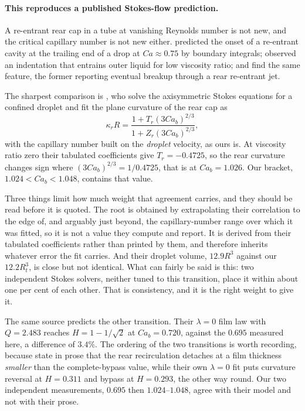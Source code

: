 \documentclass[11pt,a4paper]{article}
\begin{document}
\paragraph{This reproduces a published Stokes-flow prediction.} A re-entrant
rear cap in a tube at vanishing Reynolds number is not new, and the critical
capillary number is not new either. \citet{martinez1990axisymmetric} predicted
the onset of a re-entrant cavity at the trailing end of a drop at $Ca\approx
0.75$ by boundary integrals; \citet{olbricht1992deformation} observed an
indentation that entrains outer liquid for low viscosity ratio;
\citet{lac2009motion} and \citet{nath2017migration} find the same feature, the
former reporting eventual breakup through a rear re-entrant jet.

The sharpest comparison is \citet{balestra2018viscous}, who solve the
axisymmetric Stokes equations for a confined droplet and fit the plane
curvature of the rear cap as
\begin{equation}
  \kappa_r R=\frac{1+T_r(3Ca_b)^{2/3}}{1+Z_r(3Ca_b)^{2/3}},
  \label{eq:rearcurv}
\end{equation}
with the capillary number built on the \emph{droplet} velocity, as ours is. At viscosity ratio
zero their tabulated coefficients give $T_r=-0.4725$, so the rear curvature
changes sign where $(3Ca_b)^{2/3}=1/0.4725$, that is at $Ca_b=1.026$. Our
bracket, $1.024<Ca_b<1.048$, contains that value.

Three things limit how much weight that agreement carries, and they should be
read before it is quoted. The root is obtained by extrapolating their
correlation to the edge of, and arguably just beyond, the capillary-number
range over which it was fitted, so it is not a value they compute and report.
It is derived from their tabulated coefficients rather than printed by them,
and therefore inherits whatever error the fit carries. And their droplet
volume, $12.9R^3$ against our $12.2R_t^3$, is close but not identical. What can
fairly be said is this: two independent Stokes solvers, neither tuned to this
transition, place it within about one per cent of each other. That is
consistency, and it is the right weight to give it.

The same source predicts the other transition. Their $\lambda=0$ film law with
$Q=2.483$ reaches $H=1-1/\sqrt2$ at $Ca_b=0.720$, against the $0.695$ measured
here, a difference of $3.4\%$. The ordering of the two transitions is worth
recording, because \citet{balestra2018viscous} state in prose that the rear
recirculation detaches at a film thickness \emph{smaller} than the
complete-bypass value, while their own $\lambda=0$ fit puts curvature reversal
at $H=0.311$ and bypass at $H=0.293$, the other way round. Our two independent
measurements, $0.695$ then $1.024$--$1.048$, agree with their model and not
with their prose.
\end{document}

